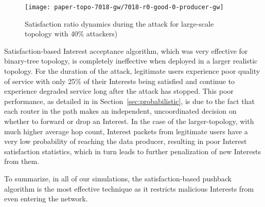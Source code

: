 %

\begin{figure}[tbh]
 \centering
 \texttt{[image: paper-topo-7018-gw/7018-r0-good-0-producer-gw]}
 \vspace{-.3cm}\caption{Satisfaction ratio dynamics during the attack for large-scale topology with 40\% attackers)}\vspace{-.4cm}
 \label{fig:large-scale}
\end{figure}

Satisfaction-based Interest acceptance algorithm, which was very effective for binary-tree topology, is completely ineffective when deployed in a larger realistic topology. For the duration of the attack, legitimate users experience poor quality of service with only 25\% of their Interests being satisfied and continue to experience degraded service long after the attack has stopped. This poor performance, as detailed in  in Section~\ref{sec:probabilistic}, is due to the fact that each router in the path makes an independent, uncoordinated decision on whether to forward or drop an Interest. In the case of the larger-topology, with much higher average hop count, Interest packets from legitimate users have a very low probability of reaching the data producer, resulting in poor Interest satisfaction statistics, which in turn leads to further penalization of new Interests from them.

To summarize, in all of our simulations, the satisfaction-based pushback algorithm is the most effective technique as it restricts malicious Interests from even entering the network. 



